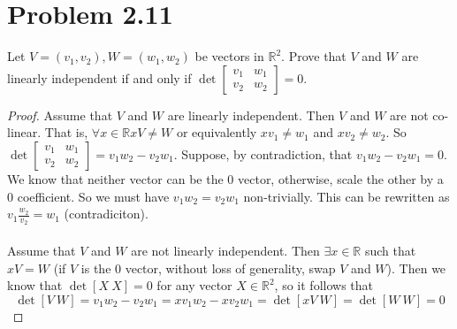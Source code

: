 \documentclass{article}
\theoremstyle{definition}
\begin{document}
\section*{Problem 2.11}
    Let $V = (v_1, v_2), W = (w_1, w_2)$ be vectors in $\mathbb{R}^2$. Prove that $V$ and $W$ are linearly independent
    if and only if $\det \begin{bmatrix}
        v_1 & w_1 \\
        v_2 & w_2
    \end{bmatrix} = 0$.
    \begin{proof}
        \fbox{$\Rightarrow$} Assume that $V$ and $W$ are linearly independent. Then $V$ and $W$ are not co-linear.
        That is, $\forall x \in \mathbb{R} xV \neq W$ or equivalently $xv_1 \neq w_1$ and $xv_2 \neq w_2$.
        So $\det \begin{bmatrix}
            v_1&w_1\\v_2&w_2
        \end{bmatrix}=v_1w_2 - v_2w_1$.
        Suppose, by contradiction, that $v_1w_2 - v_2w_1 = 0$. We know that neither vector can be the 0 vector, otherwise, scale
        the other by a 0 coefficient. So we must have $v_1w_2 = v_2w_1$ non-trivially. This can be rewritten as $v_1 \frac{w_2}{v_2} = w_1$
        (contradiciton).\\\\
        \fbox{$\Leftarrow$} Assume that $V$ and $W$ are not linearly independent. Then $\exists x \in \mathbb{R}$ such that $xV = W$
        (if $V$ is the 0 vector, without loss of generality, swap $V$ and $W$). Then we know that $\det[X \ X] = 0$ for any vector $X \in \mathbb{R}^2$,
        so it follows that 
        \[ \det [V \ W] = v_1 w_2 - v_2 w_1 = xv_1 w_2 - xv_2 w_1 = \det[xV \ W] = \det[W \ W] = 0\]
    \end{proof}
\end{document}
